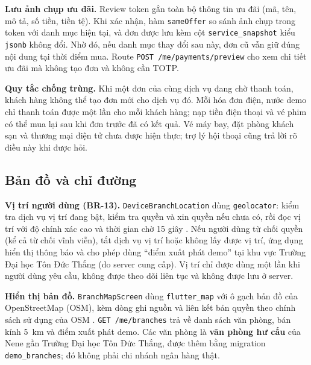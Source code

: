 \textbf{Lưu ảnh chụp ưu đãi.} Review token gắn toàn bộ thông tin ưu đãi (mã, tên, mô tả, số tiền, tiền tệ). Khi xác nhận, hàm \texttt{sameOffer} so sánh ảnh chụp trong token với danh mục hiện tại, và đơn được lưu kèm cột \texttt{service\_\allowbreak{}snapshot} kiểu \texttt{jsonb} không đổi. Nhờ đó, nếu danh mục thay đổi sau này, đơn cũ vẫn giữ đúng nội dung tại thời điểm mua. Route \texttt{POST /\allowbreak{}me/\allowbreak{}payments/\allowbreak{}preview} cho xem chi tiết ưu đãi mà không tạo đơn và không cần TOTP.

\textbf{Quy tắc chống trùng.} Khi một đơn của cùng dịch vụ đang chờ thanh toán, khách hàng không thể tạo đơn mới cho dịch vụ đó. Mỗi hóa đơn điện, nước demo chỉ thanh toán được một lần cho mỗi khách hàng; nạp tiền điện thoại và vé phim có thể mua lại sau khi đơn trước đã có kết quả. Vé máy bay, đặt phòng khách sạn và thương mại điện tử chưa được hiện thực; trợ lý hội thoại cũng trả lời rõ điều này khi được hỏi.

\subsection{Bản đồ và chỉ đường}
\label{sec:ch3-map}

\textbf{Vị trí người dùng (BR-13).} \texttt{Device\allowbreak{}Branch\allowbreak{}Location} dùng \texttt{geolocator}: kiểm tra dịch vụ vị trí đang bật, kiểm tra quyền và xin quyền nếu chưa có, rồi đọc vị trí với độ chính xác cao và thời gian chờ 15 giây \parencite{ch3-geolocator}. Nếu người dùng từ chối quyền (kể cả từ chối vĩnh viễn), tắt dịch vụ vị trí hoặc không lấy được vị trí, ứng dụng hiển thị thông báo và cho phép dùng ``điểm xuất phát demo'' tại khu vực Trường Đại học Tôn Đức Thắng (do server cung cấp). Vị trí chỉ được dùng một lần khi người dùng yêu cầu, không được theo dõi liên tục và không được lưu ở server.

\textbf{Hiển thị bản đồ.} \texttt{Branch\allowbreak{}Map\allowbreak{}Screen} dùng \texttt{flutter\_\allowbreak{}map} với ô gạch bản đồ của OpenStreetMap (OSM), kèm dòng ghi nguồn và liên kết bản quyền theo chính sách sử dụng của OSM \parencite{ch3-flutter-map,ch2-osm-tiles}. \texttt{GET /\allowbreak{}me/\allowbreak{}branches} trả về danh sách văn phòng, bán kính 5~km và điểm xuất phát demo. Các văn phòng là \textbf{văn phòng hư cấu} của Nene gần Trường Đại học Tôn Đức Thắng, được thêm bằng migration \texttt{demo\_\allowbreak{}branches}; đó không phải chi nhánh ngân hàng thật.

